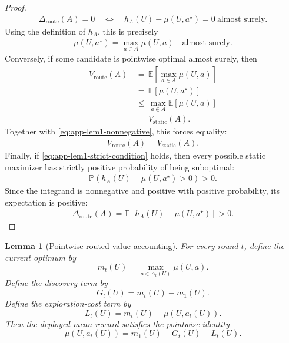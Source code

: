 \documentclass{article} %
\newtheorem{lemma}[theorem]{Lemma}
\begin{document}
\begin{proof}
\begin{align}
\Delta_{\mathrm{route}}(A)=0
\quad
\Longleftrightarrow
\quad
h_A(U)-\mu(U,a^\star)=0
\ \text{almost surely}.
\end{align}
Using the definition of \(h_A\), this is precisely
\begin{align}
\label{eq:app-lem1-proof-equality-condition}
\mu(U,a^\star)
=
\max_{a\in A}\mu(U,a)
\quad
\text{almost surely}.
\end{align}
Conversely, if some candidate is pointwise optimal almost surely, then
\begin{align}
\label{eq:app-lem1-proof-converse}
V_{\mathrm{route}}(A)
&\,=\,
\mathbb{E}\!\left[\max_{a\in A}\mu(U,a)\right]
\\
&\,=\,
\mathbb{E}[\mu(U,a^\star)]
\\
&\,\le\,
\max_{a\in A}\mathbb{E}[\mu(U,a)]
\\
&\,=\,
V_{\mathrm{static}}(A).
\end{align}
Together with \eqref{eq:app-lem1-nonnegative}, this forces equality:
\begin{align}
\label{eq:app-lem1-proof-converse-equality}
V_{\mathrm{route}}(A)
=
V_{\mathrm{static}}(A).
\end{align}
Finally, if \eqref{eq:app-lem1-strict-condition} holds, then every possible static maximizer has strictly positive probability of being suboptimal:
\begin{align}
\label{eq:app-lem1-proof-strict}
\mathbb{P}\!\left(h_A(U)-\mu(U,a^\star)>0\right)
>
0.
\end{align}
Since the integrand is nonnegative and positive with positive probability, its expectation is positive:
\begin{align}
\label{eq:app-lem1-proof-positive}
\Delta_{\mathrm{route}}(A)
=
\mathbb{E}\!\left[h_A(U)-\mu(U,a^\star)\right]
>
0.
\end{align}
\end{proof}

\begin{lemma}[Pointwise routed-value accounting]
\label{lem:2}
For every round \(t\), define the current optimum by
\begin{equation}
\label{eq:app-lem2-mt}
m_t(U)
=
\max_{a\in A_t(U)}\mu(U,a).
\end{equation}
Define the discovery term by
\begin{equation}
\label{eq:app-lem2-gt}
G_t(U)
=
m_t(U)-m_1(U).
\end{equation}
Define the exploration-cost term by
\begin{equation}
\label{eq:app-lem2-lt}
L_t(U)
=
m_t(U)-\mu(U,a_t(U)).
\end{equation}
Then the deployed mean reward satisfies the pointwise identity
\begin{equation}
\label{eq:app-lem2-identity}
\mu(U,a_t(U))
=
m_1(U)+G_t(U)-L_t(U).
\end{equation}
\end{lemma}
\end{document}

